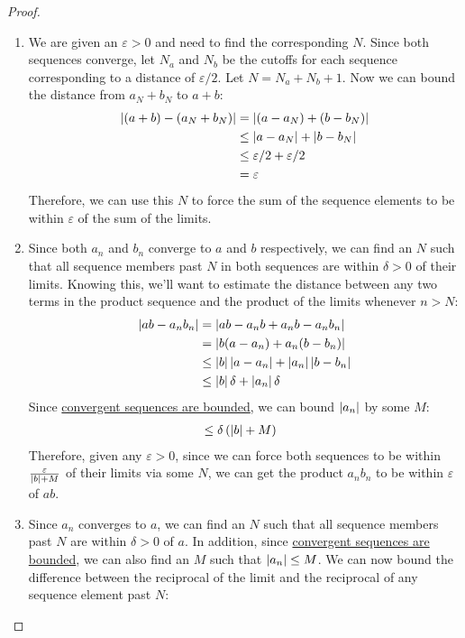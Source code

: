 \begin{proof}
\begin{enumerate}
\item We are given an $\varepsilon > 0$ and need to find the corresponding $N$. Since both sequences converge, let $N_a$ and $N_b$ be the cutoffs for each sequence corresponding to a distance of $\varepsilon/2$. Let $N = N_a + N_b + 1$. Now we can bound the distance from $a_N+b_N$ to $a+b$:
\begin{align*}
\left\lvert (a+b)-(a_N+b_N) \right\rvert &= \left\lvert (a-a_N)+(b-b_N) \right\rvert\\
&\leq \left\lvert a-a_N \right\rvert+\left\lvert b-b_N \right\rvert\\
&\leq \varepsilon/2 + \varepsilon/2\\
&= \varepsilon
\end{align*}
Therefore, we can use this $N$ to force the sum of the sequence elements to be within $\varepsilon$ of the sum of the limits.
\item Since both $a_n$ and $b_n$ converge to $a$ and $b$ respectively, we can find an $N$ such that all sequence members past $N$ in both sequences are within $\delta > 0$ of their limits. Knowing this, we'll want to estimate the distance between any two terms in the product sequence and the product of the limits whenever $n>N$:
\begin{align*}
\left\lvert ab-a_nb_n \right\rvert &= \left\lvert ab-a_nb+a_nb-a_nb_n \right\rvert\\
&= \left\lvert b(a-a_n)+a_n(b-b_n) \right\rvert\\
&\leq \left\lvert b \right\rvert\left\lvert a-a_n \right\rvert + \left\lvert a_n \right\rvert\left\lvert b-b_n \right\rvert\\
&\leq \left\lvert b \right\rvert\delta + \left\lvert a_n \right\rvert\delta
\end{align*}
Since \hyperlink{Convergent Sequences are Bounded}{convergent sequences are bounded}, we can bound $\left\lvert a_n \right\rvert$ by some $M$:
\begin{align*}
&\leq \delta\left(\left\lvert b \right\rvert+M\right)
\end{align*}
Therefore, given any $\varepsilon > 0$, since we can force both sequences to be within $\frac{\varepsilon}{\left\lvert b \right\rvert+M}$ of their limits via some $N$, we can get the product $a_nb_n$ to be within $\varepsilon$ of $ab$.
\item Since $a_n$ converges to $a$, we can find an $N$ such that all sequence members past $N$ are within $\delta > 0$ of $a$. In addition, since \hyperlink{Convergent Sequences are Bounded}{convergent sequences are bounded}, we can also find an $M$ such that $\left\lvert a_n \right\rvert\leq M$. We can now bound the difference between the reciprocal of the limit and the reciprocal of any sequence element past $N$:

\end{enumerate}
\end{proof}
